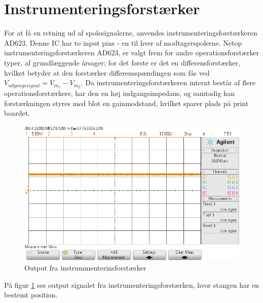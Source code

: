 \section{Instrumenteringsforstærker}\label{sec:summa}
For at få en retning ud af spolesignalerne, anvendes instrumenteringsforstærkeren AD623. Denne IC har to input pins - en til hver af modtagerspolerne.
Netop instrumenteringsforstærkeren AD623, er valgt frem for andre operationsforstærker typer, af grundlæggende årsager; for det første er det en differensforstærker, hvilket betyder at den forstærker differensspændingen som fås ved $V_{udgangssignal} = V_{in_1} - V_{in_2}$. Da instrumenteringsforstærkeren internt består af flere operationsforstærkere, har den en høj indgangsimpedans, og samtadig kan forstærkningen styres med blot en gainmodstand, hvilket sparer plads på print boardet.

\begin{figure}[h!]
	\centering
	\includegraphics[width=1\textwidth]{billeder/instr_png.png}
	\caption{Output fra instrummenterinsforstærker}
	\label{fig:filter_out}
\end{figure}
På figur \ref{fig:filter_out} ses output signalet fra instrumenteringsforstærken, hvor stangen har en bestemt position.

